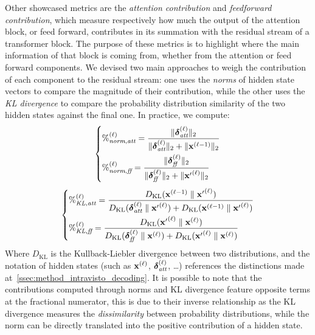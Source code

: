 Other showcased metrics are the \emph{attention contribution} and \emph{feedforward contribution}, which measure respectively how much the output of the attention block, or feed forward, contributes in its summation with the residual stream of a transformer block.
The purpose of these metrics is to highlight where the main information of that block is coming from, whether from the attention or feed forward components.
We devised two main approaches to weigh the contribution of each component to the residual stream: one uses the \emph{norms} of hidden state vectors to compare the magnitude of their contribution, while the other uses the \emph{KL divergence} to compare the probability distribution similarity of the two hidden states against the final one.
In practice, we compute:
\begin{equation}
    \left\{
    \begin{aligned}
        &{\%}^{(\ell)}_{\textit{norm},\textit{att}} = \frac{\|\bm{\mathbf{\delta}}_\textit{att}^{(\ell)}\|_2}{\|\bm{\mathbf{\delta}}_\textit{att}^{(\ell)}\|_2 + \|\bm{\mathbf{x}}^{(\ell-1)}\|_2} \\
        &{\%}^{(\ell)}_{\textit{norm},\textit{ff}} = \frac{\|\bm{\mathbf{\delta}}_\textit{ff}^{(\ell)}\|_2}{\|\bm{\mathbf{\delta}}_\textit{ff}^{(\ell)}\|_2 + \|{\bm{\mathbf{x}}'}^{(\ell)}\|_2} \label{eq:method_intravisto_norm-contrib}
    \end{aligned}
    \right.
\end{equation}
\begin{equation}
    \left\{
    \begin{aligned}
        &{\%}^{(\ell)}_{\textit{KL},\textit{att}} = \frac{D_{\text{KL}}(\bm{\mathbf{x}}^{(\ell-1)} \parallel {\bm{\mathbf{x}}'}^{(\ell)})}{D_{\text{KL}}(\bm{\mathbf{\delta}}_\textit{att}^{(\ell)} \parallel {\bm{\mathbf{x}}'}^{(\ell)}) + D_{\text{KL}}(\bm{\mathbf{x}}^{(\ell-1)} \parallel {\bm{\mathbf{x}}'}^{(\ell)})} \\
        &{\%}^{(\ell)}_{\textit{KL},\textit{ff}} = \frac{D_{\text{KL}}({\bm{\mathbf{x}}'}^{(\ell)} \parallel \bm{\mathbf{x}}^{(\ell)})}{D_{\text{KL}}(\bm{\mathbf{\delta}}_\textit{ff}^{(\ell)} \parallel \bm{\mathbf{x}}^{(\ell)}) + D_{\text{KL}}({\bm{\mathbf{x}}'}^{(\ell)} \parallel \bm{\mathbf{x}}^{(\ell)})} \label{eq:method_intravisto_kl-contrib}
    \end{aligned}
    \right.
\end{equation}
Where $D_{\text{KL}}$ is the Kullback-Liebler divergence between two distributions, and the notation of hidden states (such as $\bm{\mathbf{x}}^{(\ell)}$, $\bm{\mathbf{\delta}}_\textit{att}^{(\ell)}$, \ldots) references the distinctions made at~\cref{ssec:method_intravisto_decoding}.
It is possible to note that the contributions computed through norms and KL divergence feature opposite terms at the fractional numerator, this is due to their inverse relationship as the KL divergence measures the \emph{dissimilarity} between probability distributions, while the norm can be directly translated into the positive contribution of a hidden state. 

